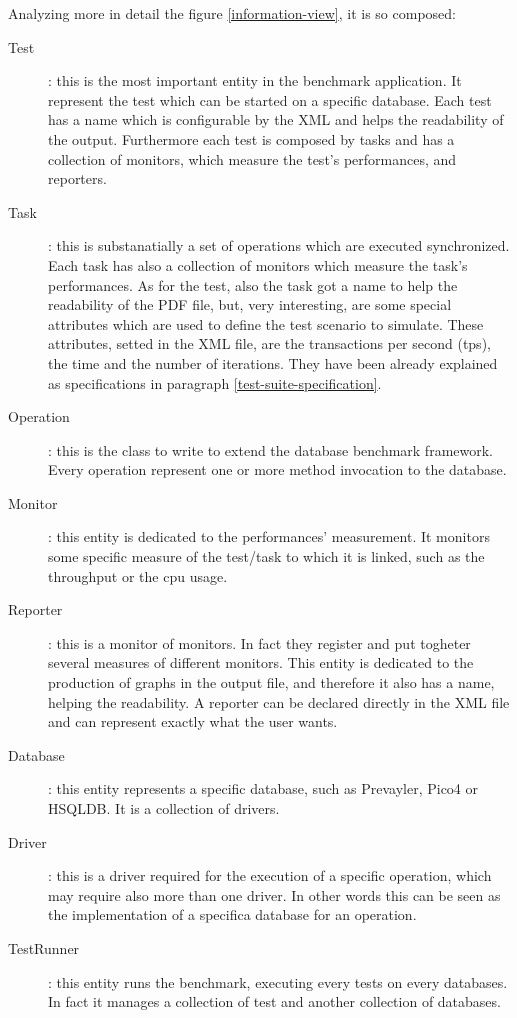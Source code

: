 Analyzing more in detail the figure \ref{information-view}, it is so composed:
\begin{description}
	\item[Test]: this is the most important entity in the benchmark application. It represent the test which can be started on a specific database. Each test has a name which is configurable by the XML and helps the readability of the output. Furthermore each test is composed by tasks and has a collection of monitors, which measure the test's performances, and reporters. 
	\item[Task]: this is substanatially a set of operations which are executed synchronized. Each task has also a collection of monitors which measure the task's performances. As for the test, also the task got a name to help the readability of the PDF file, but, very interesting, are some special attributes which are used to define the test scenario to simulate. These attributes, setted in the XML file, are the transactions per second (tps), the time and the number of iterations. They have been already explained as specifications in paragraph \ref{test-suite-specification}.
	\item[Operation]: this is the class to write to extend the database benchmark framework. Every operation represent one or more method invocation to the database. 
	\item[Monitor]: this entity is dedicated to the performances' measurement. It monitors some specific measure of the test/task to which it is linked, such as the throughput or the cpu usage.
	\item[Reporter]: this is a monitor of monitors. In fact they register and put togheter several measures of different monitors. This entity is dedicated to the production of graphs in the output file, and therefore it also has a name, helping the readability. A reporter can be declared directly in the XML file and can represent exactly what the user wants.
	\item[Database]: this entity represents a specific database, such as Prevayler, Pico4 or HSQLDB. It is a collection of drivers.
	\item[Driver]: this is a driver required for the execution of a specific operation, which may require also more than one driver. In other words this can be seen as the implementation of a specifica database for an operation.
	\item[TestRunner]: this entity runs the benchmark, executing every tests on every databases. In fact it manages a collection of test and another collection of databases.
\end{description}

